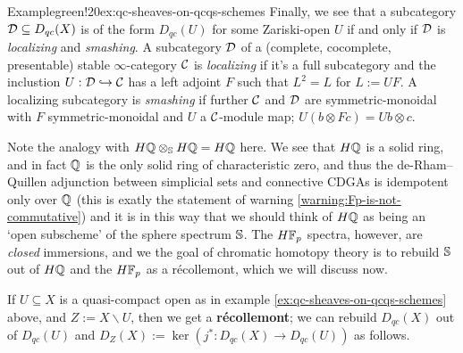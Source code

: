 \begin{env}{Example}{green!20}{ex:qc-sheaves-on-qcqs-schemes}
	Finally, we see that a subcategory $\Da \subseteq D_{qc}(X)$ is of the form $D_{qc}(U)$ for some Zariski-open $U$ if and only if $\Da$ is \textit{localizing} and \textit{smashing}. A subcategory $\Da$ of a (complete, cocomplete, presentable) stable $\infty$-category $\Ca$ is \textit{localizing} if it's a full subcategory and the inclustion $U : \Da \hookrightarrow \Ca$ has a left adjoint $F$ such that $L^2 = L$ for $L := UF$. A localizing subcategory is \textit{smashing} if further $\Ca$ and $\Da$ are symmetric-monoidal with $F$ symmetric-monoidal and $U$ a $\Ca$-module map; $U(b \otimes Fc) = Ub \otimes c$. 
\end{env}

Note the analogy with $H\Q \otimes_\S H\Q = H\Q$ here. We see that $H\Q$ is a solid ring, and in fact $\Q$ is the only solid ring of characteristic zero, and thus the de-Rham--Quillen adjunction between simplicial sets and connective CDGAs is idempotent only over $\Q$ (this is exatly the statement of warning \ref{warning:Fp-is-not-commutative}) and it is in this way that we should think of $H\Q$ as being an `open subscheme' of the sphere spectrum $\S$. The $H\F_p$ spectra, however, are \textit{closed} immersions, and we the goal of chromatic homotopy theory is to rebuild $\S$ out of $H\Q$ and the $H\F_p$ as a r\'ecollemont, which we will discuss now. 

If $U \subseteq X$ is a quasi-compact open as in example \ref{ex:qc-sheaves-on-qcqs-schemes} above, and $Z := X \backslash U$, then we get a \textbf{r\'ecollemont}; we can rebuild $D_{qc}(X)$ out of $D_{qc}(U)$ and $D_Z(X) := \ker(j^\ast : D_{qc}(X) \to D_{qc}(U))$ as follows. 






















